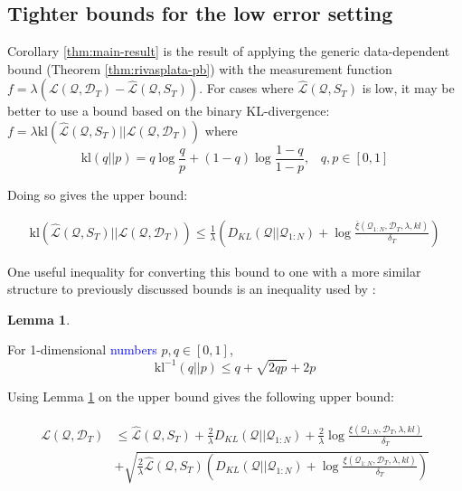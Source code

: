 \documentclass{article}
\theoremstyle{definition}
\newtheorem{lemma}[theorem]{Lemma}
\newcommand{\LFe}[1]{\textcolor{blue}{#1}}
\begin{document}
\subsection{Tighter bounds for the low error setting}

Corollary \ref{thm:main-result} is the result of applying the generic data-dependent bound (Theorem \ref{thm:rivasplata-pb}) with the measurement function $f=\lambda(\mathcal{L}(\mathcal{Q},\mathcal{D}_T)-\hat{\mathcal{L}}(\mathcal{Q}, S_T))$. For cases where $\hat{\mathcal{L}}(\mathcal{Q}, S_T)$ is low, it may be better to use a bound based on the binary KL-divergence: $f=\lambda \mathrm{kl}(\hat{\mathcal{L}}(\mathcal{Q}, S_T)||\mathcal{L}(\mathcal{Q},\mathcal{D}_T))$
where $$\mathrm{kl}(q||p)=q \log\frac{q}{p}+(1-q)\log\frac{1-q}{1-p},\;\;\; q,p\in[0, 1]$$

Doing so gives the upper bound:

\begin{align} \label{eq:generic-kl-bound}
\mathrm{kl}(\hat{\mathcal{L}}(\mathcal{Q}, S_T)||\mathcal{L}(\mathcal{Q},\mathcal{D}_T)) \leq \frac{1}{\lambda}\left (D_{KL}(\mathcal{Q}||\mathcal{Q}_{1:N})+\log\frac{\bar{\xi}(\mathcal{Q}_{1:N}, \mathcal{D}_T,\lambda, kl)}{\delta_T} \right )
\end{align}

One useful inequality for converting this bound to one with a more similar structure to previously discussed bounds is an inequality used by \citet{Tolstikhin2013}:

\begin{lemma} \citep{Tolstikhin2013} \label{thm:kl-inverse}
	
	For 1-dimensional \LFe{numbers} $p,q \in [0, 1]$,
	$$\mathrm{kl}^{-1}(q||p)\leq q + \sqrt{2qp}+2p$$
\end{lemma}

Using Lemma \ref{thm:kl-inverse} on the upper bound gives the following upper bound:

\begin{align} \label{eq:tolstikhin-kl-bound}
\begin{split}
\mathcal{L}(\mathcal{Q},\mathcal{D}_T) &\leq \hat{\mathcal{L}}(\mathcal{Q}, S_T) + \frac{2}{\lambda}D_{KL}(\mathcal{Q}||\mathcal{Q}_{1:N})+\frac{2}{\lambda}\log\frac{\xi(\mathcal{Q}_{1:N}, \mathcal{D}_T,\lambda, kl)}{\delta_T}\\
&+\sqrt{\frac{2}{\lambda}\hat{\mathcal{L}}(\mathcal{Q}, S_T)\left (D_{KL}(\mathcal{Q}||\mathcal{Q}_{1:N})+\log\frac{\xi(\mathcal{Q}_{1:N}, \mathcal{D}_T,\lambda, kl)}{\delta_T}\right )}
\end{split}
\end{align}
\end{document}
